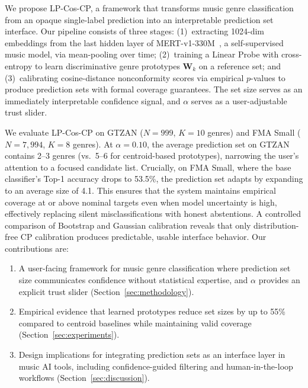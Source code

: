 We propose LP-Cos-CP, a framework that transforms music genre classification
from an opaque single-label prediction into an interpretable prediction set
interface. Our pipeline consists of three stages: (1)~extracting 1024-dim
embeddings from the last hidden layer of MERT-v1-330M~\cite{li2023mert}, a
self-supervised music model, via mean-pooling over time; (2)~training a Linear
Probe with cross-entropy to learn discriminative genre prototypes $\mathbf{W}_k$
on a reference set; and (3)~calibrating cosine-distance nonconformity scores via
empirical $p$-values to produce prediction sets with formal coverage
guarantees. The set size serves as an immediately interpretable confidence
signal, and $\alpha$ serves as a user-adjustable trust slider.

We evaluate LP-Cos-CP on GTZAN ($N=999$, $K=10$ genres) and FMA Small
($N=7{,}994$, $K=8$ genres). At $\alpha = 0.10$, the average prediction set
on GTZAN contains 2--3 genres (vs.\ 5--6 for centroid-based prototypes), narrowing the
user's attention to a focused candidate list.
Crucially, on FMA Small, where the base classifier's Top-1 accuracy drops to 53.5\%,
the prediction set adapts by expanding to an average size of 4.1. This ensures that the
system maintains empirical coverage at or above nominal targets even when model uncertainty is high, effectively replacing silent misclassifications with honest abstentions. A controlled
comparison of Bootstrap and Gaussian calibration reveals that only
distribution-free CP calibration produces predictable, usable interface
behavior. Our contributions are:

\begin{enumerate}[leftmargin=*,itemsep=0pt]
    \item A user-facing framework for music genre classification where
    prediction set size communicates confidence without statistical expertise,
    and $\alpha$ provides an explicit trust slider (Section~\ref{sec:methodology}).
    \item Empirical evidence that learned prototypes reduce set sizes by up to
    55\% compared to centroid baselines while maintaining valid coverage
    (Section~\ref{sec:experiments}).
    \item Design implications for integrating prediction sets as an interface
    layer in music AI tools, including confidence-guided filtering and
    human-in-the-loop workflows (Section~\ref{sec:discussion}).
\end{enumerate}
